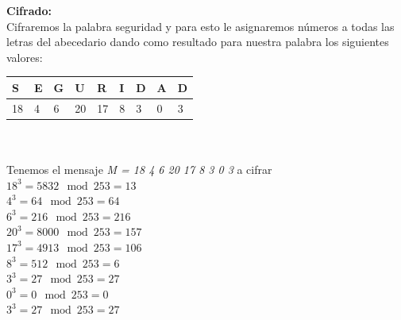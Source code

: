 %
%


%
\noindent

\textbf{ Cifrado: }\\

Cifraremos la palabra seguridad y para esto le asignaremos números a todas las letras del abecedario dando como resultado para nuestra palabra los siguientes valores: \\

\begin{tabular}{ |p{1cm}|p{1cm}|p{1cm}|p{1cm}|p{1cm}|p{1cm}|p{1cm}|p{1cm}|p{1cm}| }
\hline
{ S } & { E } & { G } & { U } & { R } & { I } & { D } & { A } & { D } \\
\hline
{ 18 } & { 4 } & { 6 } & { 20 } & { 17 } & { 8 } & { 3 } & { 0 } & { 3 } \\
\hline
\end{tabular}
\\ \\

Tenemos el mensaje \textit{ M = 18 4 6 20 17 8 3 0 3 } a cifrar\\

\textit{$ 18^{3} = 5832 \mod 253 = 13$} \\

\textit{$ 4^{3} = 64 \mod 253 = 64$} \\

\textit{$ 6^{3} = 216 \mod 253 = 216 $} \\ 

\textit{$ 20^{3} = 8000 \mod 253 = 157 $} \\

\textit{$ 17^{3} = 4913 \mod 253 = 106 $}\\

\textit{$ 8^{3} = 512 \mod 253 = 6 $}\\

\textit{$ 3^{3} = 27 \mod 253 = 27 $}\\

\textit{$ 0^{3} = 0 \mod 253 = 0 $}\\

\textit{$ 3^{3} = 27 \mod 253 = 27 $}\\


